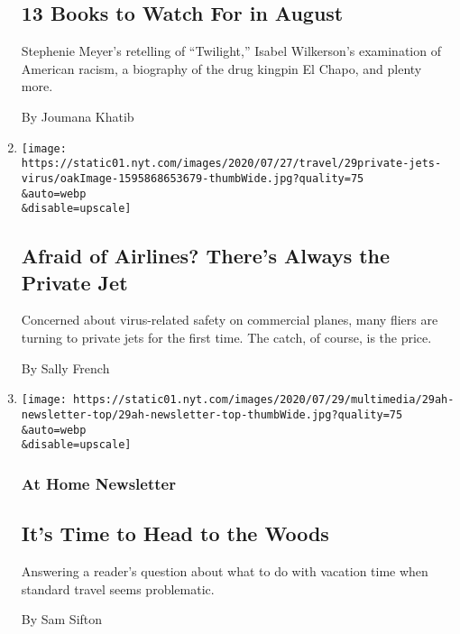 \begin{enumerate}
  \hypertarget{13-books-to-watch-for-in-august}{%
  \subsection{13 Books to Watch For in
  August}\label{13-books-to-watch-for-in-august}}

  Stephenie Meyer's retelling of ``Twilight,'' Isabel Wilkerson's
  examination of American racism, a biography of the drug kingpin El
  Chapo, and plenty more.

  By Joumana Khatib
\item
  \href{/2020/07/30/travel/private-jets-coronavirus.html}{}

  \texttt{[image: https://static01.nyt.com/images/2020/07/27/travel/29private-jets-virus/oakImage-1595868653679-thumbWide.jpg?quality=75\\\&auto=webp\\\&disable=upscale]}

  \hypertarget{afraid-of-airlines-theres-always-the-private-jet}{%
  \subsection{Afraid of Airlines? There's Always the Private
  Jet}\label{afraid-of-airlines-theres-always-the-private-jet}}

  Concerned about virus-related safety on commercial planes, many fliers
  are turning to private jets for the first time. The catch, of course,
  is the price.

  By Sally French
\item
  \href{/2020/07/29/at-home/newsletter.html}{}

  \texttt{[image: https://static01.nyt.com/images/2020/07/29/multimedia/29ah-newsletter-top/29ah-newsletter-top-thumbWide.jpg?quality=75\\\&auto=webp\\\&disable=upscale]}

  \hypertarget{at-home-newsletter-1}{%
  \subsubsection{At Home Newsletter}\label{at-home-newsletter-1}}

  \hypertarget{its-time-to-head-to-the-woods}{%
  \subsection{It's Time to Head to the
  Woods}\label{its-time-to-head-to-the-woods}}

  Answering a reader's question about what to do with vacation time when
  standard travel seems problematic.

  By Sam Sifton
\end{enumerate}

